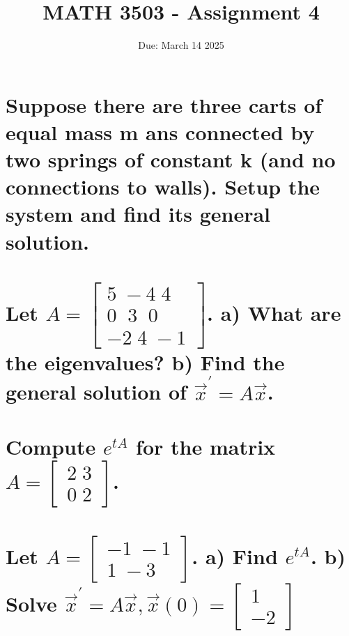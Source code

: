 \documentclass{article}
\title{MATH 3503 - Assignment 4}
\date{Due: March 14 2025}
\begin{document}
\maketitle

\section{Suppose there are three carts of equal mass m ans connected by two springs of constant k (and no connections to walls). Setup the system and find its general solution.}

\section{Let $A = \begin{bmatrix} 5 \; -4 \; 4 \\ 0 \; \; 3 \; \; 0 \\ -2 \; 4 \; -1 \end{bmatrix}$. a) What are the eigenvalues? b) Find the general solution of $\vec{x}^{'} = A \vec{x}$. }

\section{Compute $e^{tA}$ for the matrix $A = \begin{bmatrix} 2 \; 3 \\ 0 \; 2 \end{bmatrix}$.}

\section{Let $A = \begin{bmatrix} -1 \; -1 \\ 1 \; -3 \end{bmatrix}$. a) Find $e^{tA}$. b) Solve $\vec{x}^{'} = A\vec{x}, \vec{x}(0) = \begin{bmatrix} 1 \\ -2 \end{bmatrix}$}
\end{document}
